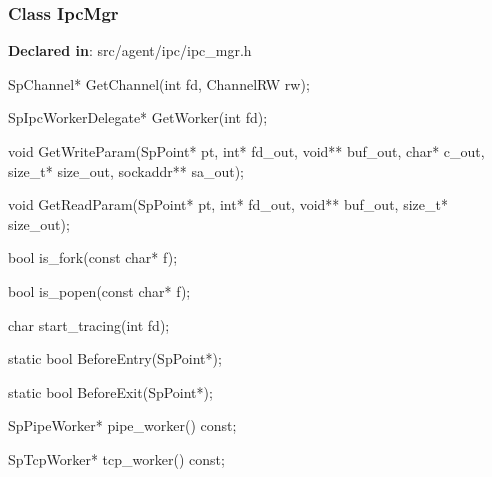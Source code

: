 \subsubsection{Class IpcMgr}
\textbf{Declared in}: src/agent/ipc/ipc\_mgr.h

\begin{apient}
SpChannel* GetChannel(int fd,
                      ChannelRW rw);
\end{apient}
\apidesc{
}

\begin{apient}
SpIpcWorkerDelegate* GetWorker(int fd);
\end{apient}
\apidesc{
}

\begin{apient}
void GetWriteParam(SpPoint* pt,
                   int* fd_out,
                   void** buf_out,
                   char* c_out,
                   size_t* size_out,
                   sockaddr** sa_out);
\end{apient}
\apidesc{
}

\begin{apient}
void GetReadParam(SpPoint* pt,
                  int* fd_out,
                  void** buf_out,
                  size_t* size_out);
\end{apient}
\apidesc{
}

\begin{apient}
bool is_fork(const char* f);
\end{apient}
\apidesc{
}

\begin{apient}
bool is_popen(const char* f);
\end{apient}
\apidesc{
}

\begin{apient}
char start_tracing(int fd);
\end{apient}
\apidesc{
}

\begin{apient}
static bool BeforeEntry(SpPoint*);
\end{apient}
\apidesc{
}

\begin{apient}
static bool BeforeExit(SpPoint*);
\end{apient}
\apidesc{
}

\begin{apient}
SpPipeWorker* pipe_worker() const;
\end{apient}
\apidesc{
}

\begin{apient}
SpTcpWorker* tcp_worker() const;
\end{apient}
\apidesc{
}

